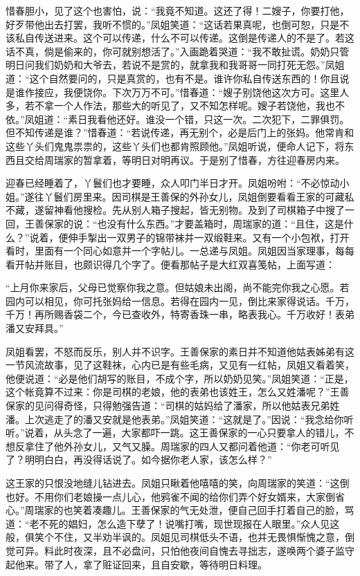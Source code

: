 \documentclass[12pt,oneside]{book}
\begin{document}
惜春胆小，见了这个也害怕，说：“我竟不知道。这还了得！二嫂子，你要打他，好歹带他出去打罢，我听不惯的。”凤姐笑道：“这话若果真呢，也倒可恕，只是不该私自传送进来。这个可以传递，什么不可以传递。这倒是传递人的不是了。若这话不真，倘是偷来的，你可就别想活了。”入画跪着哭道：“我不敢扯谎。奶奶只管明日问我们奶奶和大爷去，若说不是赏的，就拿我和我哥哥一同打死无怨。”凤姐道：“这个自然要问的，只是真赏的，也有不是。谁许你私自传送东西的！你且说是谁作接应，我便饶你。下次万万不可。”惜春道：“嫂子别饶他这次方可。这里人多，若不拿一个人作法，那些大的听见了，又不知怎样呢。嫂子若饶他，我也不依。”凤姐道：“素日我看他还好。谁没一个错，只这一次。二次犯下，二罪俱罚。但不知传递是谁？”惜春道：“若说传递，再无别个，必是后门上的张妈。他常肯和这些丫头们鬼鬼祟祟的，这些丫头们也都肯照顾他。”凤姐听说，便命人记下，将东西且交给周瑞家的暂拿着，等明日对明再议。于是别了惜春，方往迎春房内来。

迎春已经睡着了，丫鬟们也才要睡，众人叩门半日才开。凤姐吩咐：“不必惊动小姐。”遂往丫鬟们房里来。因司棋是王善保的外孙女儿，凤姐倒要看看王家的可藏私不藏，遂留神看他搜检。先从别人箱子搜起，皆无别物。及到了司棋箱子中搜了一回，王善保家的说：“也没有什么东西。”才要盖箱时，周瑞家的道：“且住，这是什么？”说着，便伸手掣出一双男子的锦带袜并一双缎鞋来。又有一个小包袱，打开看时，里面有一个同心如意并一个字帖儿。一总递与凤姐。凤姐因当家理事，每每看开帖并账目，也颇识得几个字了。便看那帖子是大红双喜笺帖，上面写道：

“上月你来家后，父母已觉察你我之意。但姑娘未出阁，尚不能完你我之心愿。若园内可以相见，你可托张妈给一信息。若得在园内一见，倒比来家得说话。千万，千万！再所赐香袋二个，今已查收外，特寄香珠一串，略表我心。千万收好！表弟潘又安拜具。”

凤姐看罢，不怒而反乐，别人并不识字。王善保家的素日并不知道他姑表姊弟有这一节风流故事，见了这鞋袜，心内已是有些毛病，又见有一红帖，凤姐又看着笑，他便说道：“必是他们胡写的账目，不成个字，所以奶奶见笑。”凤姐笑道：“正是，这个帐竟算不过来：你是司棋的老娘，他的表弟也该姓王，怎么又姓潘呢？”王善保家的见问得奇怪，只得勉强告道：“司棋的姑妈给了潘家，所以他姑表兄弟姓潘。上次逃走了的潘又安就是他表弟。”凤姐笑道：“这就是了。”因说：“我念给你听听。”说着，从头念了一遍，大家都吓一跳。这王善保家的一心只要拿人的错儿，不想反拿住了他外孙女儿，又气又臊。周瑞家的四人又都问着他道：“你老可听见了？明明白白，再没得话说了。如今据你老人家，该怎么样？”

这王家的只恨没地缝儿钻进去。凤姐只瞅着他嘻嘻的笑，向周瑞家的笑道：“这倒也好。不用你们老娘操一点儿心，他鸦雀不闻的给你们弄个好女婿来，大家倒省心。”周瑞家的也笑着凑趣儿。王善保家的气无处泄，便自己回手打着自己的脸，骂道：“老不死的娼妇，怎么造下孽了！说嘴打嘴，现世现报在人眼里。”众人见这般，俱笑个不住，又半劝半讽的。凤姐见司棋低头不语，也并无畏惧惭愧之意，倒觉可异。料此时夜深，且不必盘问，只怕他夜间自愧去寻拙志，遂唤两个婆子监守起他来。带了人，拿了赃证回来，且自安歇，等待明日料理。
\end{document}
